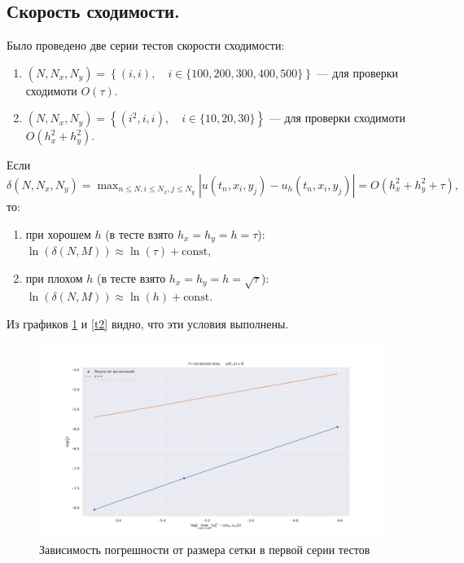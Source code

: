 \documentclass[14pt,a4paper]{extarticle}
\newcommand{\1}{\mathbbm{1}}
\begin{document}
\subsection{Скорость сходимости.}
Было проведено две серии тестов скорости сходимости: 
\begin{enumerate}
    \item $(N, N_x, N_y) = \left\{(i, i), \quad i \in \{100, 200, 300, 400, 500\} \right\}$ --- для проверки сходимоти $O(\tau)$.
    \item $(N, N_x, N_y) = \left\{(i^2, i, i), \quad i \in \{10, 20, 30\} \right\}$ --- для проверки сходимоти $O(h_x^2 + h_y^2)$.
\end{enumerate}
Если $\delta(N, N_x, N_y) = \max_{n\leq N, i \leq N_x, j \leq N_y} |u(t_n, x_i, y_j) - u_h(t_n, x_i, y_j)| = O(h_x^2 + h_y^2 + \tau), $ то: 
\begin{enumerate}
    \item при хорошем $h$ (в тесте взято $h_x = h_y = h = \tau  $): \\$ \ln\left(\delta(N, M)\right) \approx \ln(\tau) + \text{const},$
    \item при плохом  $h$ (в тесте взято $h_x = h_y = h = \sqrt{\tau}$): \\$ \ln\left(\delta(N, M)\right) \approx \ln(h) + \text{const}.$
\end{enumerate}
Из графиков \ref{t1} и \ref{t2} видно, что эти условия выполнены. 
\begin{figure}
    \centering
    \includegraphics[scale=0.4]{figs/OrderCon1.pdf}
    \caption{Зависимость погрешности от размера сетки в первой серии тестов}
    \label{t1}
\end{figure}
\end{document}

